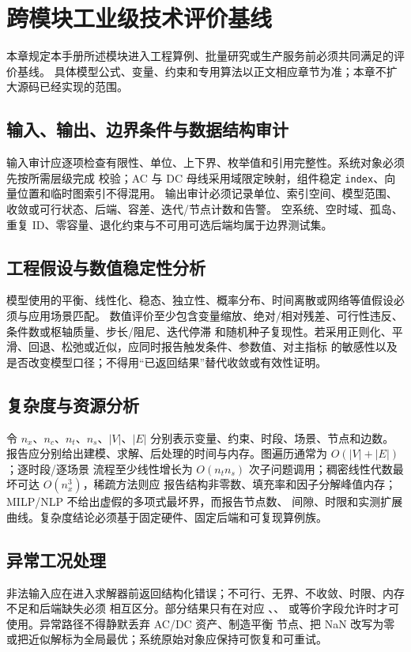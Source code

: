 \section{跨模块工业级技术评价基线}

本章规定本手册所述模块进入工程算例、批量研究或生产服务前必须共同满足的评价基线。
具体模型公式、变量、约束和专用算法以正文相应章节为准；本章不扩大源码已经实现的范围。

\subsection{输入、输出、边界条件与数据结构审计}
输入审计应逐项检查有限性、单位、上下界、枚举值和引用完整性。系统对象必须先按所需层级完成
校验；AC 与 DC 母线采用域限定映射，组件稳定 \texttt{index}、向量位置和临时图索引不得混用。
输出审计必须记录单位、索引空间、模型范围、收敛或可行状态、后端、容差、迭代/节点计数和告警。
空系统、空时域、孤岛、重复 ID、零容量、退化约束与不可用可选后端均属于边界测试集。

\subsection{工程假设与数值稳定性分析}
模型使用的平衡、线性化、稳态、独立性、概率分布、时间离散或网络等值假设必须与应用场景匹配。
数值评价至少包含变量缩放、绝对/相对残差、可行性违反、条件数或枢轴质量、步长/阻尼、迭代停滞
和随机种子复现性。若采用正则化、平滑、回退、松弛或近似，应同时报告触发条件、参数值、对主指标
的敏感性以及是否改变模型口径；不得用“已返回结果”替代收敛或有效性证明。

\subsection{复杂度与资源分析}
令 $n_x$、$n_c$、$n_t$、$n_s$、$|V|$、$|E|$ 分别表示变量、约束、时段、场景、节点和边数。
报告应分别给出建模、求解、后处理的时间与内存。图遍历通常为 $O(|V|+|E|)$；逐时段/逐场景
流程至少线性增长为 $O(n_t n_s)$ 次子问题调用；稠密线性代数最坏可达 $O(n_x^3)$，稀疏方法则应
报告结构非零数、填充率和因子分解峰值内存；MILP/NLP 不给出虚假的多项式最坏界，而报告节点数、
间隙、时限和实测扩展曲线。复杂度结论必须基于固定硬件、固定后端和可复现算例族。

\subsection{异常工况处理}
非法输入应在进入求解器前返回结构化错误；不可行、无界、不收敛、时限、内存不足和后端缺失必须
相互区分。部分结果只有在对应 、、
 或等价字段允许时才可使用。异常路径不得静默丢弃 AC/DC 资产、制造平衡
节点、把 NaN 改写为零或把近似解标为全局最优；系统原始对象应保持可恢复和可重试。

